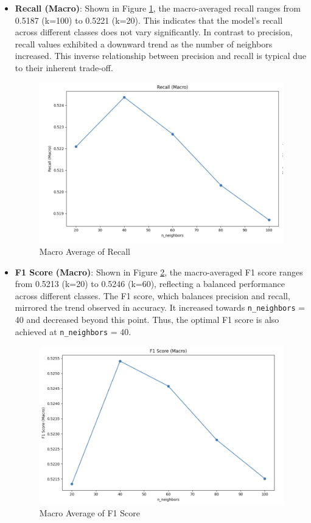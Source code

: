 \documentclass[times, twocolumn]{article}
\begin{document}
\begin{itemize}
    \item \textbf{Recall (Macro)}: Shown in Figure \ref{fig:recall}, the macro-averaged recall ranges from 0.5187 (k=100) to 0.5221 (k=20). This indicates that the model's recall across different classes does not vary significantly. In contrast to precision, recall values exhibited a downward trend as the number of neighbors increased. This inverse relationship between precision and recall is typical due to their inherent trade-off.
    \begin{figure}[H]
        \centering
        \includegraphics[width=1.0\linewidth]{KNN_recall_macro.png}
        \caption{Macro Average of Recall}
        \label{fig:recall}
    \end{figure}
    
    \item \textbf{F1 Score (Macro)}: Shown in Figure \ref{fig:f1}, the macro-averaged F1 score ranges from 0.5213 (k=20) to 0.5246 (k=60), reflecting a balanced performance across different classes. The F1 score, which balances precision and recall, mirrored the trend observed in accuracy. It increased towards \verb|n_neighbors| = 40 and decreased beyond this point. Thus, the optimal F1 score is also achieved at \verb|n_neighbors| = 40.
    \begin{figure}[H]
        \centering
        \includegraphics[width=1.0\linewidth]{KNN_F1Score.png}
        \caption{Macro Average of F1 Score}
        \label{fig:f1}
    \end{figure}
\end{itemize}
\end{document}
